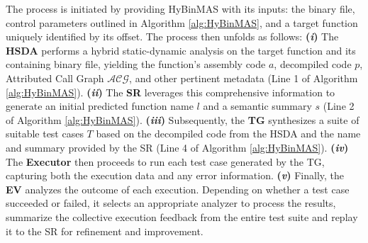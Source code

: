\documentclass[acmsmall,screen,review,anonymous]{acmart} %
\begin{document}
The process is initiated by providing HyBinMAS with its inputs: the binary file, control parameters outlined in Algorithm \ref{alg:HyBinMAS}, and a target function uniquely identified by its offset. The process then unfolds as follows: \textbf{(\textit{i})} The \textbf{HSDA} performs a hybrid static-dynamic analysis on the target function and its containing binary file, yielding the function's assembly code $a$, decompiled code $p$, Attributed Call Graph $\mathcal{ACG}$, and other pertinent metadata (Line 1 of Algorithm \ref{alg:HyBinMAS}). \textbf{(\textit{ii})} The \textbf{SR} leverages this comprehensive information to generate an initial predicted function name $l$ and a semantic summary $s$ (Line 2 of Algorithm \ref{alg:HyBinMAS}). \textbf{(\textit{iii})} Subsequently, the \textbf{TG} synthesizes a suite of suitable test cases $T$ based on the decompiled code from the HSDA and the name and summary provided by the SR (Line 4 of Algorithm \ref{alg:HyBinMAS}). \textbf{(\textit{iv})} The \textbf{Executor} then proceeds to run each test case generated by the TG, capturing both the execution data and any error information. \textbf{(\textit{v})} Finally, the \textbf{EV} analyzes the outcome of each execution. Depending on whether a test case succeeded or failed, it selects an appropriate analyzer to process the results, summarize the collective execution feedback from the entire test suite and replay it to the SR for refinement and improvement.


\end{document}

